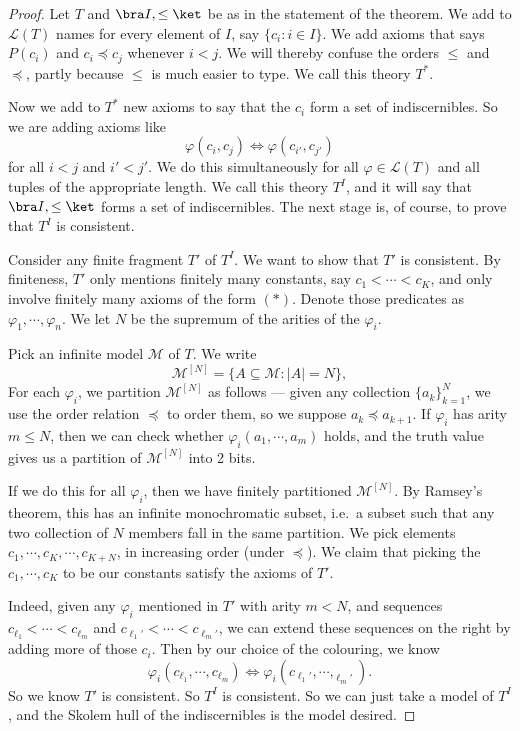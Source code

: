\documentclass[a4paper]{article}
\begin{document}
\begin{proof}
  Let $T$ and $\bra I, \leq \ket$ be as in the statement of the theorem. We add to $\mathcal{L}(T)$ names for every element of $I$, say $\{c_i: i \in I\}$. We add axioms that says $P(c_i)$ and $c_i \preccurlyeq c_j$ whenever $i < j$. We will thereby confuse the orders $\leq$ and $\preccurlyeq$, partly because $\leq$ is much easier to type. We call this theory $T^*$.

  Now we add to $T^*$ new axioms to say that the $c_i$ form a set of indiscernibles. So we are adding axioms like
  \[
    \varphi(c_i, c_j) \Leftrightarrow \varphi(c_{i'}, c_{j'})\tag{$*$}
  \]
  for all $i < j$ and $i' < j'$. We do this simultaneously for all $\varphi \in \mathcal{L}(T)$ and all tuples of the appropriate length. We call this theory $T^I$, and it will say that $\bra I, \leq\ket$ forms a set of indiscernibles. The next stage is, of course, to prove that $T^I$ is consistent.

  Consider any finite fragment $T'$ of $T^I$. We want to show that $T'$ is consistent. By finiteness, $T'$ only mentions finitely many constants, say $c_1 < \cdots < c_K$, and only involve finitely many axioms of the form $(*)$. Denote those predicates as $\varphi_1, \cdots, \varphi_n$. We let $N$ be the supremum of the arities of the $\varphi_i$.

  Pick an infinite model $\mathcal{M}$ of $T$. We write
  \[
    \mathcal{M}^{[N]} = \{A \subseteq \mathcal{M}: |A| = N\},
  \]
  For each $\varphi_i$, we partition $\mathcal{M}^{[N]}$ as follows --- given any collection $\{a_k\}_{k = 1}^N$, we use the order relation $\preccurlyeq$ to order them, so we suppose $a_k \preccurlyeq a_{k + 1}$. If $\varphi_i$ has arity $m \leq N$, then we can check whether $\varphi_i(a_1, \cdots, a_m)$ holds, and the truth value gives us a partition of $\mathcal{M}^{[N]}$ into 2 bits.

  If we do this for all $\varphi_i$, then we have finitely partitioned $\mathcal{M}^{[N]}$. By Ramsey's theorem, this has an infinite monochromatic subset, i.e.\ a subset such that any two collection of $N$ members fall in the same partition. We pick elements $c_1, \cdots, c_K, \cdots, c_{K + N}$, in increasing order (under $\preccurlyeq$). We claim that picking the $c_1, \cdots, c_K$ to be our constants satisfy the axioms of $T'$.

  Indeed, given any $\varphi_i$ mentioned in $T'$ with arity $m < N$, and sequences $c_{\ell_1} < \cdots < c_{\ell_m}$ and $c_{\ell_1'} < \cdots < c_{\ell_m'}$, we can extend these sequences on the right by adding more of those $c_i$. Then by our choice of the colouring, we know
  \[
    \varphi_i(c_{\ell_1}, \cdots, c_{\ell_m}) \Leftrightarrow \varphi_i(c_{\ell_1'}, \cdots, _{\ell_m'}).
  \]
  So we know $T'$ is consistent. So $T^I$ is consistent. So we can just take a model of $T^I$, and the Skolem hull of the indiscernibles is the model desired.
\end{proof}
\end{document}
